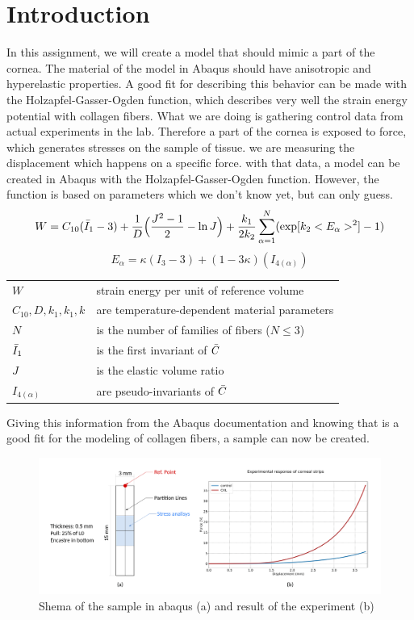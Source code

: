 \documentclass[12pt]{article}
\makeatletter
\newenvironment{conditions}
  {\par\vspace{\abovedisplayskip}\noindent\begin{tabular}{>{$}l<{$} @{${}={}$} l}}
  {\end{tabular}\par\vspace{\belowdisplayskip}}
\makeatother
\begin{document}
\tableofcontents
\pagebreak
\section{Introduction}
In this assignment, we will create a model that should mimic a part of the cornea. The material of the model in Abaqus should have anisotropic and hyperelastic properties. A good fit for describing this behavior can be made with the Holzapfel-Gasser-Ogden function, which describes very well the strain energy potential with collagen fibers.
What we are doing is gathering control data from actual experiments in the lab. Therefore a part of the cornea is exposed to force, which generates stresses on the sample of tissue. we are measuring the displacement which happens on a specific force. with that data, a model can be created in Abaqus with the Holzapfel-Gasser-Ogden function. However, the function is based on parameters which we don't know yet, but can only guess.
\begin{equation}\label{eq:holzapfel}
  W=C_{10}(\Bar{I}_{1}-3)+\frac{1}{D}\Big(\frac{J^{2}-1}{2}-\ln J\Big)+\frac{k_{1}}{2k_{2}}\sum_{\alpha=1}^{N}(\exp[k_{2}<E_{\alpha}>^{2}]-1)
\end{equation}
\begin{equation}\label{eq:holzapfel_e}
  E_{\alpha}=\kappa(I_{3}-3)+(1-3\kappa)(I_{4(\alpha)})
\end{equation}
\begin{conditions}
  W                             &  strain energy per unit of reference volume\\
  C_{10},D,k_{1},k_{1},k        &  are temperature-dependent material parameters\\
  N                             &  is the number of families of fibers ($N \leq 3$)\\   
  \Bar{I}_{1}                   &  is the first invariant of $\Bar{C}$ \cite{Holzapfel-Gasser-Ogden} \\
  J                             &  is the elastic volume ratio\\
  I_{4(\alpha)}                 &  are pseudo-invariants of $\Bar{C}$
\end{conditions}
Giving this information from the Abaqus documentation \cite{Holzapfel-Gasser-Ogden} and knowing that is a good fit for the modeling of collagen fibers, a sample can now be created.
\begin{figure}[!htb]
    \centering
    \includegraphics[width=0.9\linewidth]{pics/assignment_org}
   \caption{Shema of the sample in abaqus (a) and result of the experiment (b)}
    \label{fig:1}
  \end{figure}
\end{document}
